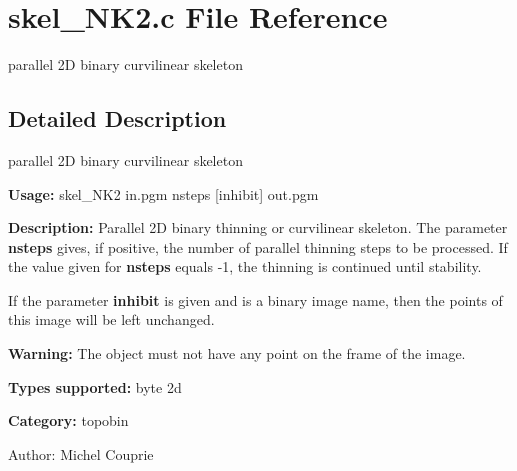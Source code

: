 \section{skel\_\-NK2.c File Reference}
\label{skel__NK2_8c}
parallel 2D binary curvilinear skeleton 



\subsection{Detailed Description}
parallel 2D binary curvilinear skeleton 

{\bf Usage:} skel\_\-NK2 in.pgm nsteps [inhibit] out.pgm

{\bf Description:} Parallel 2D binary thinning or curvilinear skeleton. The parameter {\bf nsteps} gives, if positive, the number of parallel thinning steps to be processed. If the value given for {\bf nsteps} equals -1, the thinning is continued until stability.

If the parameter {\bf inhibit} is given and is a binary image name, then the points of this image will be left unchanged.

{\bf Warning:} The object must not have any point on the frame of the image.

{\bf Types supported:} byte 2d

{\bf Category:} topobin

\begin{Desc}
\item[Author:]Michel Couprie \end{Desc}
